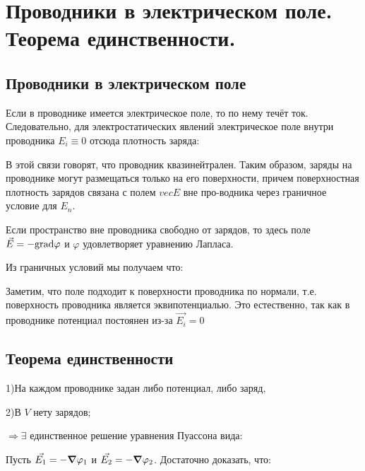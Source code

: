 \section{Проводники в электрическом поле. Теорема единственности.}

\subsection*{Проводники в электрическом поле}


Если в проводнике имеется электрическое поле, то по нему течёт ток. Следовательно, для электростатических явлений электрическое поле внутри проводника $E_{i}\equiv0$ отсюда плотность заряда: 


В этой связи говорят, что проводник квазинейтрален. Таким образом,
заряды на проводнике могут размещаться только на его поверхности,
причем поверхностная плотность зарядов связана с полем $vec{E}$ вне про-водника через граничное условие для $E_n$.

Если пространство вне проводника свободно от зарядов, то здесь поле 
$\vec{E}=-\mathrm{grad}\varphi$ и $\varphi$ удовлетворяет уравнению Лапласа.

Из граничных условий мы получаем что:


Заметим, что поле подходит к поверхности проводника по нормали, т.е. поверхность
проводника является эквипотенциалью. Это естественно, так как в проводнике потенциал постоянен из-за $\vec{E_i}=0$

\subsection*{Теорема единственности}



1)На каждом проводнике задан либо потенциал, либо заряд,

2)В $V$ нету зарядов;

$\Rightarrow \exists$ единственное решение уравнения Пуассона вида:



Пусть $\vec{E_1}=-\grad\varphi_1$ и $\vec{E_2}=-\grad\varphi_2$. Достаточно доказать, что:

